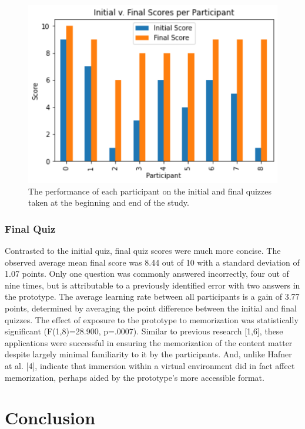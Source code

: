 \documentclass{vgtc}                          %
\begin{document}
\begin{figure}[tb]
 \centering 
 \includegraphics[width=\linewidth]{InitialFinalScores.png}
 \caption{The performance of each participant on the initial and final quizzes taken at the beginning and end of the study.}
 \label{fig:sample}
\end{figure}

\subsubsection{Final Quiz}

Contrasted to the initial quiz, final quiz scores were much more concise. The observed average mean final score was 8.44 out of 10 with a standard deviation of 1.07 points. Only one question was commonly answered incorrectly, four out of nine times, but is attributable to a previously identified error with two answers in the prototype. The average learning rate between all participants is a gain of 3.77 points, determined by averaging the point difference between the initial and final quizzes. The effect of exposure to the prototype to memorization was statistically significant (F(1,8)=28.900, p=.0007). Similar to previous research [1,6], these applications were successful in ensuring the memorization of the content matter despite largely minimal familiarity to it by the participants. And, unlike Hafner at al. [4], indicate that immersion within a virtual environment did in fact affect memorization, perhaps aided by the prototype's more accessible format.

\section{Conclusion}
\end{document}
